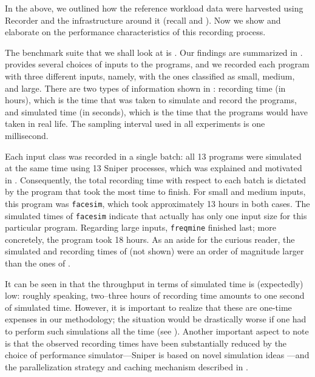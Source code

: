 
In the above, we outlined how the reference workload data were harvested using
Recorder and the infrastructure around it (recall  and
). Now we show and elaborate on the performance characteristics
of this recording process.

The benchmark suite that we shall look at is . Our findings are
summarized in .  provides several choices of inputs
to the programs, and we recorded each program with three different inputs,
namely, with the ones classified as small, medium, and large. There are two
types of information shown in : recording time (in hours), which
is the time that was taken to simulate and record the programs, and simulated
time (in seconds), which is the time that the programs would have taken in real
life. The sampling interval used in all experiments is one millisecond.

Each input class was recorded in a single batch: all 13 programs were simulated
at the same time using 13 Sniper processes, which was explained and motivated in
. Consequently, the total recording time with respect to each
batch is dictated by the program that took the most time to finish. For small
and medium inputs, this program was \texttt{facesim}, which took approximately
13 hours in both cases. The simulated times of \texttt{facesim} indicate that
 actually has only one input size for this particular program.
Regarding large inputs, \texttt{freqmine} finished last; more concretely, the
program took 18 hours. As an aside for the curious reader, the simulated and
recording times of  (not shown) were an order of magnitude
larger than the ones of .

It can be seen in  that the throughput in terms of simulated
time is (expectedly) low: roughly speaking, two--three hours of recording time
amounts to one second of simulated time. However, it is important to realize
that these are one-time expenses in our methodology; the situation would be
drastically worse if one had to perform such simulations all the time (see
). Another important aspect to note is that the observed
recording times have been substantially reduced by the choice of performance
simulator---Sniper is based on novel simulation ideas \cite{carlson2011}---and
the parallelization strategy and caching mechanism described in .
